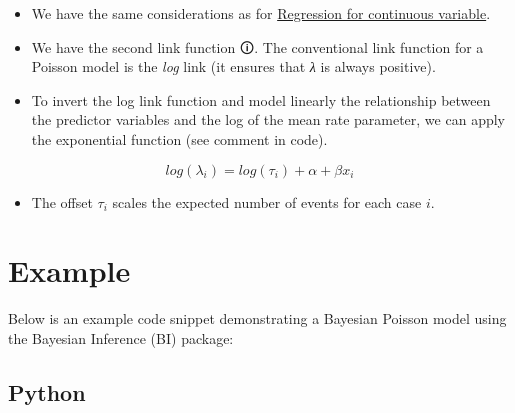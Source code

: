 \documentclass[
  letterpaper,
  DIV=11,
  numbers=noendperiod]{scrreprt}
\providecommand{\tightlist}{%
  \setlength{\itemsep}{0pt}\setlength{\parskip}{0pt}}\usepackage{longtable,booktabs,array}
\begin{document}
\begin{tcolorbox}[enhanced jigsaw, toptitle=1mm, opacityback=0, titlerule=0mm, breakable, bottomrule=.15mm, colframe=quarto-callout-caution-color-frame, arc=.35mm, coltitle=black, left=2mm, opacitybacktitle=0.6, leftrule=.75mm, toprule=.15mm, rightrule=.15mm, bottomtitle=1mm, colbacktitle=quarto-callout-caution-color!10!white, title=\textcolor{quarto-callout-caution-color}{\faFire}\hspace{0.5em}{Caution}, colback=white]

\begin{itemize}
\item
  We have the same considerations as for
  \href{1.\%20Linear\%20Regression\%20for\%20continuous\%20variable.qmd}{Regression
  for continuous variable}.
\item
  We have the second \label{linkF}{{link function 🛈}}.
  The conventional link function for a Poisson model is the \emph{log}
  link (it ensures that \emph{λ} is always positive).
\item
  To invert the log link function and model linearly the relationship
  between the predictor variables and the log of the mean rate
  parameter, we can apply the exponential function (see comment in
  code).
\end{itemize}

\[
log(\lambda_i) = log(\tau_i) + \alpha + \beta x_i
\]

\begin{itemize}
\tightlist
\item
  The offset \(τ_i\) scales the expected number of events for each case
  \(i\).
\end{itemize}

\end{tcolorbox}

\section{Example}\label{example-6}

Below is an example code snippet demonstrating a Bayesian Poisson model
using the Bayesian Inference (BI) package:

\subsection{Python}
\end{document}
